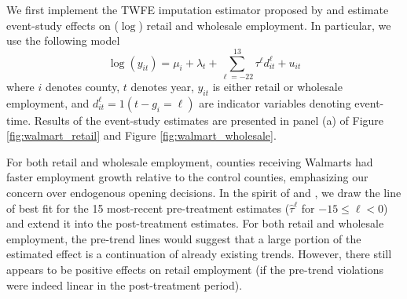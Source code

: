 \documentclass[12pt]{article}
\begin{document}
We first implement the TWFE imputation estimator proposed by \citet{Borusyak_Jaravel_Spiess_2021} and estimate event-study effects on ($\log$) retail and wholesale employment. In particular, we use the following model
\begin{equation}\label{eq:Walmart_twfe}
  \log(y_{it}) = \mu_i + \lambda_t + \sum_{\ell=-22}^{13} \tau^\ell d_{it}^\ell + u_{it}
\end{equation}
where $i$ denotes county, $t$ denotes year, $y_{it}$ is either retail or wholesale employment, and $d_{it}^\ell = 1(t - g_i = \ell)$ are indicator variables denoting event-time. Results of the event-study estimates are presented in panel (a) of Figure \ref{fig:walmart_retail} and Figure \ref{fig:walmart_wholesale}.

For both retail and wholesale employment, counties receiving Walmarts had faster employment growth relative to the control counties, emphasizing our concern over endogenous opening decisions. In the spirit of \citet{Freyaldenhoven_Hansen_Perez_Shapiro_2022} and \citet{rambachan2023more}, we draw the line of best fit for the 15 most-recent pre-treatment estimates ($\hat{\tau}^\ell$ for $-15 \leq \ell < 0$) and extend it into the post-treatment estimates. For both retail and wholesale employment, the pre-trend lines would suggest that a large portion of the estimated effect is a continuation of already existing trends. However, there still appears to be positive effects on retail employment (if the pre-trend violations were indeed linear in the post-treatment period). 
\end{document}
